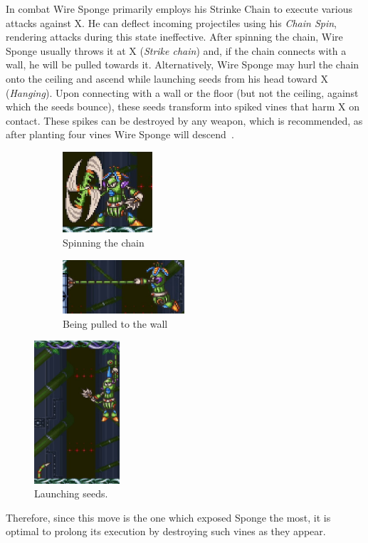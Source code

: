 In combat Wire Sponge primarily employs his Strinke Chain to execute various attacks against X. He can deflect incoming projectiles using his \emph{Chain Spin}, rendering attacks during this state ineffective. After spinning the chain, Wire Sponge usually throws it at X (\emph{Strike chain}) and, if the chain connects with a wall, he will be pulled towards it. Alternatively, Wire Sponge may hurl the chain onto the ceiling and ascend while launching seeds from his head toward X (\emph{Hanging}). Upon connecting with a wall or the floor (but not the ceiling, against which the seeds bounce), these seeds transform into spiked vines that harm X on contact. These spikes can be destroyed by any weapon, which is recommended, as after planting four vines Wire Sponge will descend~\cite{rta:x2}.\begin{figure}[htp]
	\centering	
	\begin{minipage}[b]{0.4\linewidth}		
		\begin{subfigure}{\linewidth}
			\centering
			\includegraphics[height=3cm]{figures/X2/Wire_sponge/Sponge_spin.png}
			\caption{Spinning the chain}
		\end{subfigure}
		\begin{subfigure}{\linewidth}
			\centering
			\includegraphics[height=2cm]{figures/X2/Wire_sponge/Sponge_pull.jpg}
			\caption{Being pulled to the wall}
		\end{subfigure}
	\end{minipage}
	\begin{minipage}[b]{0.4\linewidth}		
		\centering
		\includegraphics[height=5.3cm]{figures/X2/Wire_sponge/Sponge_hang.jpg}
		\caption{Launching seeds.}
	\end{minipage}
\end{figure} Therefore, since this move is the one which exposed Sponge the most, it is optimal to prolong its execution by destroying such vines as they appear.
